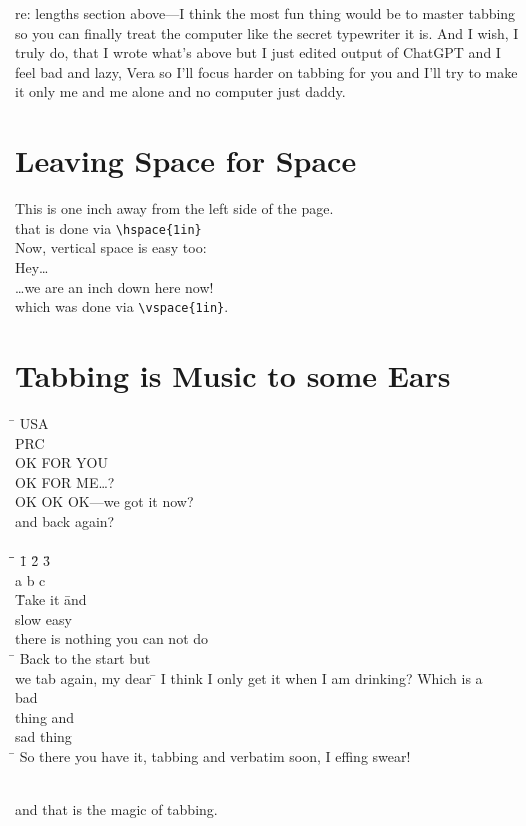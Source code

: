 \documentclass[10pt|draft]{report}
\begin{document}
re: lengths section above---I think the most fun thing would be to master tabbing so you can finally treat the computer like the secret typewriter it is. And I wish, I truly do, that I wrote what's above but I just edited output of ChatGPT and I feel bad and lazy, Vera so I'll focus harder on tabbing for you and I'll try to make it only me and me alone and no computer just daddy.
\section*{Leaving Space for Space}

\hspace{1in}This is one inch away from the left side of the page. \\
that is done via \verb|\hspace{1in}| \\
Now, vertical space is easy too: \\
\vspace{1in}Hey\dots\\
\dots we are an inch down here now! \\
which was done via \verb|\vspace{1in}|.


\section*{Tabbing is Music to some Ears}

\begin{tabbing}
        \=              \kill
        \> USA
        \= \\
        \>  \> PRC
            \= \\
            \> \> \> OK FOR YOU
                \= \\
            \> \> \> \> OK FOR ME\dots?
                \= \\
            \> \> \> \> \> OK OK OK---we got it now?
                \= \\
and back again? \\ \\
\= \kill \= \kill
\= 1 \= 2 \=3 \\
\> a \> b \> c \\


\= Take it \= and \\
\> slow \> easy \= \\
\> \> \> there is nothing you can not do \\
\= \kill
Back to the start but \= \\
\> we tab again, my dear
\= \kill
I think I only get it when I am drinking? Which is a \\
\> bad \\
thing and \\
\> sad
thing \\
\= \kill
\> So there you have it, tabbing and verbatim soon, I effing swear!

\= \= \= \= \= \=\\
\> \> \> \> \> \> and that is the magic of tabbing.

\end{tabbing}
\end{document}
